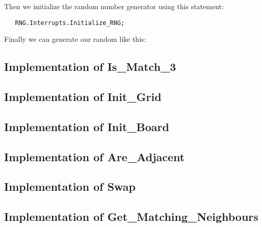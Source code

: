 \noindent
Then we initialize the random number generator using this statement:
\begin{lstlisting}
   RNG.Interrupts.Initialize_RNG;
\end{lstlisting}


\noindent
Finally we can generate our random \sqs like this:


\subsection{Implementation of Is\_Match\_3}


\newpage

\subsection{Implementation of Init\_Grid}


\subsection{Implementation of Init\_Board}


\newpage

\subsection{Implementation of Are\_Adjacent}


\subsection{Implementation of Swap}


\subsection{Implementation of Get\_Matching\_Neighbours}


\newpage

